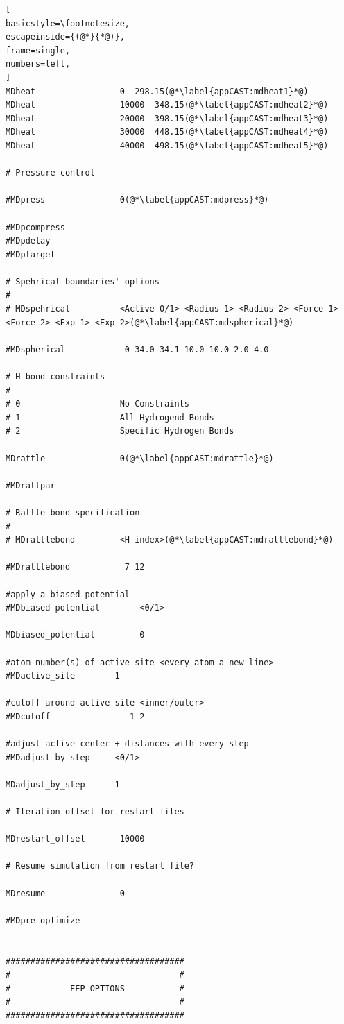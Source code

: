 \documentclass[a4paper,11pt]{scrartcl}
\begin{document}
\begin{lstlisting}[
basicstyle=\footnotesize,
escapeinside={(@*}{*@)},
frame=single,
numbers=left,
]
MDheat                 0  298.15(@*\label{appCAST:mdheat1}*@)
MDheat                 10000  348.15(@*\label{appCAST:mdheat2}*@)
MDheat                 20000  398.15(@*\label{appCAST:mdheat3}*@)
MDheat                 30000  448.15(@*\label{appCAST:mdheat4}*@)
MDheat                 40000  498.15(@*\label{appCAST:mdheat5}*@)

# Pressure control

#MDpress               0(@*\label{appCAST:mdpress}*@)

#MDpcompress
#MDpdelay
#MDptarget

# Spehrical boundaries' options
# 
# MDspehrical          <Active 0/1> <Radius 1> <Radius 2> <Force 1> <Force 2> <Exp 1> <Exp 2>(@*\label{appCAST:mdspherical}*@)

#MDspherical            0 34.0 34.1 10.0 10.0 2.0 4.0

# H bond constraints
#
# 0                    No Constraints
# 1                    All Hydrogend Bonds
# 2                    Specific Hydrogen Bonds

MDrattle               0(@*\label{appCAST:mdrattle}*@)

#MDrattpar

# Rattle bond specification
#
# MDrattlebond         <H index>(@*\label{appCAST:mdrattlebond}*@)

#MDrattlebond           7 12

#apply a biased potential
#MDbiased potential        <0/1>

MDbiased_potential         0

#atom number(s) of active site <every atom a new line> 
#MDactive_site        1

#cutoff around active site <inner/outer>
#MDcutoff                1 2

#adjust active center + distances with every step
#MDadjust_by_step     <0/1>

MDadjust_by_step      1

# Iteration offset for restart files

MDrestart_offset       10000

# Resume simulation from restart file?

MDresume               0

#MDpre_optimize


####################################
#                                  #
#            FEP OPTIONS           #
#                                  #
####################################


\end{lstlisting}
\end{document}
